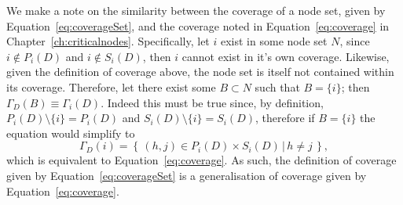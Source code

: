 We make a note on the similarity between the coverage of a node set, given by Equation~\ref{eq:coverageSet}, and the coverage noted in Equation~\ref{eq:coverage} in Chapter~\ref{ch:criticalnodes}. Specifically, let $i$ exist in some node set $N$, since $i \notin P_{i}(D)$ and $i \notin S_{i}(D)$, then $i$ cannot exist in it's own coverage. Likewise, given the definition of coverage above, the node set is itself not contained within its coverage. Therefore, let there exist some $B \subset N$ such that $B = \{ i \}$; then $\Gamma_{D}(B) \equiv \Gamma_i (D)$. Indeed this must be true since, by definition, $P_{i}(D) \setminus \{i\} = P_{i}(D)$ and $S_{i}(D) \setminus \{i\} = S_{i}(D)$, therefore if $B = \{i\}$ the equation would simplify to 
\begin{equation}
\Gamma_D (i) = \left\{ \left. \, (h,j) \in P_{i} \left( D \right) \times S_{i} \left( D \right) \, \right| \, h \neq j \, \right\},
\end{equation}
which is equivalent to Equation~\ref{eq:coverage}. As such, the definition of coverage given by Equation~\ref{eq:coverageSet} is a generalisation of coverage given by Equation~\ref{eq:coverage}.

